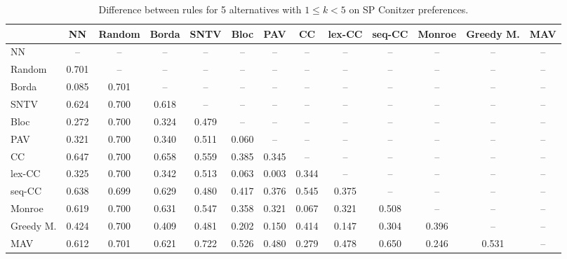 
\begin{table*}[htbp]
\centering
\begin{tabular}{lcccccccccccc}
\toprule
 & NN & Random & Borda & SNTV & Bloc & PAV & CC & lex-CC & seq-CC & Monroe & Greedy M. & MAV \\
\midrule
NN & -- & -- & -- & -- & -- & -- & -- & -- & -- & -- & -- & -- \\
Random & \cellcolor{blue!70} 0.701 & -- & -- & -- & -- & -- & -- & -- & -- & -- & -- & -- \\
Borda & \cellcolor{blue!8} 0.085 & \cellcolor{blue!70} 0.701 & -- & -- & -- & -- & -- & -- & -- & -- & -- & -- \\
SNTV & \cellcolor{blue!62} 0.624 & \cellcolor{blue!70} 0.700 & \cellcolor{blue!61} 0.618 & -- & -- & -- & -- & -- & -- & -- & -- & -- \\
Bloc & \cellcolor{blue!27} 0.272 & \cellcolor{blue!70} 0.700 & \cellcolor{blue!32} 0.324 & \cellcolor{blue!47} 0.479 & -- & -- & -- & -- & -- & -- & -- & -- \\
PAV & \cellcolor{blue!32} 0.321 & \cellcolor{blue!70} 0.700 & \cellcolor{blue!34} 0.340 & \cellcolor{blue!51} 0.511 & \cellcolor{blue!6} 0.060 & -- & -- & -- & -- & -- & -- & -- \\
CC & \cellcolor{blue!64} 0.647 & \cellcolor{blue!70} 0.700 & \cellcolor{blue!65} 0.658 & \cellcolor{blue!55} 0.559 & \cellcolor{blue!38} 0.385 & \cellcolor{blue!34} 0.345 & -- & -- & -- & -- & -- & -- \\
lex-CC & \cellcolor{blue!32} 0.325 & \cellcolor{blue!70} 0.700 & \cellcolor{blue!34} 0.342 & \cellcolor{blue!51} 0.513 & \cellcolor{blue!6} 0.063 & \cellcolor{blue!0} 0.003 & \cellcolor{blue!34} 0.344 & -- & -- & -- & -- & -- \\
seq-CC & \cellcolor{blue!63} 0.638 & \cellcolor{blue!69} 0.699 & \cellcolor{blue!62} 0.629 & \cellcolor{blue!48} 0.480 & \cellcolor{blue!41} 0.417 & \cellcolor{blue!37} 0.376 & \cellcolor{blue!54} 0.545 & \cellcolor{blue!37} 0.375 & -- & -- & -- & -- \\
Monroe & \cellcolor{blue!61} 0.619 & \cellcolor{blue!70} 0.700 & \cellcolor{blue!63} 0.631 & \cellcolor{blue!54} 0.547 & \cellcolor{blue!35} 0.358 & \cellcolor{blue!32} 0.321 & \cellcolor{blue!6} 0.067 & \cellcolor{blue!32} 0.321 & \cellcolor{blue!50} 0.508 & -- & -- & -- \\
Greedy M. & \cellcolor{blue!42} 0.424 & \cellcolor{blue!70} 0.700 & \cellcolor{blue!40} 0.409 & \cellcolor{blue!48} 0.481 & \cellcolor{blue!20} 0.202 & \cellcolor{blue!15} 0.150 & \cellcolor{blue!41} 0.414 & \cellcolor{blue!14} 0.147 & \cellcolor{blue!30} 0.304 & \cellcolor{blue!39} 0.396 & -- & -- \\
MAV & \cellcolor{blue!61} 0.612 & \cellcolor{blue!70} 0.701 & \cellcolor{blue!62} 0.621 & \cellcolor{blue!72} 0.722 & \cellcolor{blue!52} 0.526 & \cellcolor{blue!48} 0.480 & \cellcolor{blue!27} 0.279 & \cellcolor{blue!47} 0.478 & \cellcolor{blue!65} 0.650 & \cellcolor{blue!24} 0.246 & \cellcolor{blue!53} 0.531 & -- \\
\bottomrule
\end{tabular}

\caption{Difference between rules for 5 alternatives with $1 \leq k < 5$ on SP Conitzer preferences.}
\label{tab:rule_distance_heatmap-m=[5]-pref_dist=single_peaked_conitzer}
\end{table*}
    